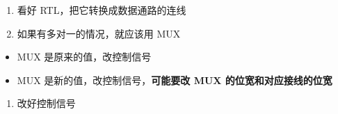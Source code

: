 \documentclass[12pt,AutoFakeBold,AutoFakeSlant]{article}
\providecommand{\tightlist}{%
  \setlength{\itemsep}{0pt}\setlength{\parskip}{0pt}}
\begin{document}
\begin{enumerate}
\def\labelenumi{\arabic{enumi}.}
\tightlist
\item
  看好 RTL，把它转换成数据通路的连线
\item
  如果有多对一的情况，就应该用 MUX
\end{enumerate}

\begin{itemize}
\tightlist
\item
  MUX 是原来的值，改控制信号
\item
  MUX 是新的值，改控制信号，\textbf{可能要改 MUX 的位宽和对应接线的位宽}
\end{itemize}

\begin{enumerate}
\def\labelenumi{\arabic{enumi}.}
\setcounter{enumi}{2}
\tightlist
\item
  改好控制信号
\end{enumerate}
\end{document}
